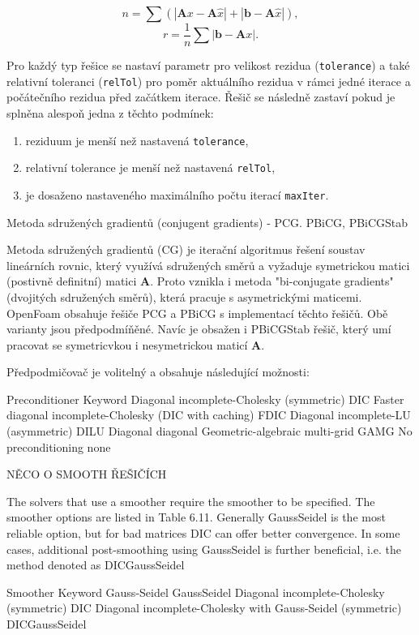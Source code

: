 \documentclass[a4paper,12pt]{report}
\theoremstyle{remark}
\begin{document}
$$n = \sum \left( | \boldsymbol{A}x - \boldsymbol{A}\hat{x} | + | \boldsymbol{b} - \boldsymbol{A}\hat{x} | \right),$$
$$r = \frac{1}{n} \sum | \boldsymbol{b} - \boldsymbol{A}x |.$$ 

Pro každý typ řešice se nastaví parametr pro velikost rezidua (\texttt{tolerance}) a také relativní toleranci (\texttt{relTol}) pro poměr aktuálního rezidua v rámci jedné iterace a počátečního rezidua před začátkem iterace. Řešič se následně zastaví pokud je splněna alespoň jedna z těchto podmínek:
\begin{enumerate}
	\item reziduum je menší než nastavená \texttt{tolerance},
	\item relativní tolerance je menší než nastavená \texttt{relTol},
	\item je dosaženo nastaveného maximálního počtu iterací \texttt{maxIter}.
\end{enumerate}


Metoda sdružených gradientů (conjugent gradients) - PCG. PBiCG, PBiCGStab

Metoda sdružených gradientů (CG) je iterační algoritmus řešení soustav lineárních rovnic, který využívá sdružených směrů a vyžaduje symetrickou matici (postivně definitní) matici $\boldsymbol{A}$. Proto vznikla i metoda "bi-conjugate gradients" (dvojitých sdružených směrů), která pracuje s asymetrickými maticemi. OpenFoam obsahuje řešiče PCG a PBiCG s implementací těchto řešičů. Obě varianty jsou předpodmíňěné. Navíc je obsažen i PBiCGStab řešič, který umí pracovat se symetricvkou i nesymetrickou maticí $\boldsymbol{A}$.

Předpodmičovač je volitelný a obsahuje následující možnosti:

Preconditioner	Keyword
Diagonal incomplete-Cholesky (symmetric)	DIC
Faster diagonal incomplete-Cholesky (DIC with caching)	FDIC
Diagonal incomplete-LU (asymmetric)	DILU
Diagonal	diagonal
Geometric-algebraic multi-grid	GAMG
No preconditioning	none



NĚCO O SMOOTH ŘEŠIČÍCH 

The solvers that use a smoother require the smoother to be specified. The smoother options are listed in Table 6.11. Generally GaussSeidel is the most reliable option, but for bad matrices DIC can offer better convergence. In some cases, additional post-smoothing using GaussSeidel is further beneficial, i.e. the method denoted as DICGaussSeidel


Smoother	Keyword
Gauss-Seidel	GaussSeidel
Diagonal incomplete-Cholesky (symmetric)	DIC
Diagonal incomplete-Cholesky with Gauss-Seidel (symmetric)	DICGaussSeidel
\end{document}
